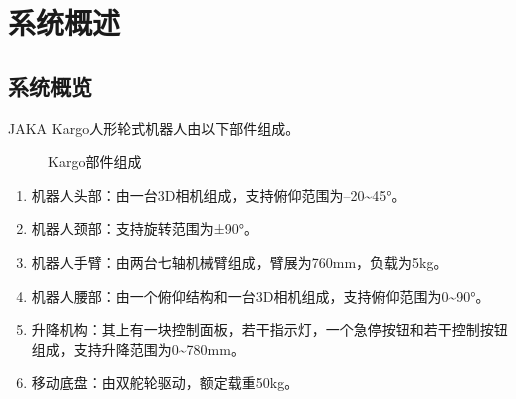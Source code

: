 \documentclass[a4paper,11pt,english,openany,oneside]{sphinxmanual}
\begin{document}
\sphinxstepscope


\chapter{系统概述}
\label{\detokenize{06 _u7cfb_u7edf_u6982_u8ff0:id1}}\label{\detokenize{06 _u7cfb_u7edf_u6982_u8ff0:id2}}\label{\detokenize{06 _u7cfb_u7edf_u6982_u8ff0::doc}}

\section{系统概览}
\label{\detokenize{06 _u7cfb_u7edf_u6982_u8ff0:id3}}\label{\detokenize{06 _u7cfb_u7edf_u6982_u8ff0:id4}}
\sphinxAtStartPar
JAKA Kargo人形轮式机器人由以下部件组成。

\begin{figure}[H]
\centering
\capstart

\noindent{}
\caption{Kargo部件组成}\label{\detokenize{06 _u7cfb_u7edf_u6982_u8ff0:id7}}\end{figure}


\begin{enumerate}
%
\item {} 
\sphinxAtStartPar
机器人头部：由一台3D相机组成，支持俯仰范围为–20\textasciitilde{}45°。

\item {} 
\sphinxAtStartPar
机器人颈部：支持旋转范围为±90°。

\item {} 
\sphinxAtStartPar
机器人手臂：由两台七轴机械臂组成，臂展为760mm，负载为5kg。

\item {} 
\sphinxAtStartPar
机器人腰部：由一个俯仰结构和一台3D相机组成，支持俯仰范围为0\textasciitilde{}90°。

\item {} 
\sphinxAtStartPar
升降机构：其上有一块控制面板，若干指示灯，一个急停按钮和若干控制按钮组成，支持升降范围为0\textasciitilde{}780mm。

\item {} 
\sphinxAtStartPar
移动底盘：由双舵轮驱动，额定载重50kg。

\end{enumerate}
\end{document}
